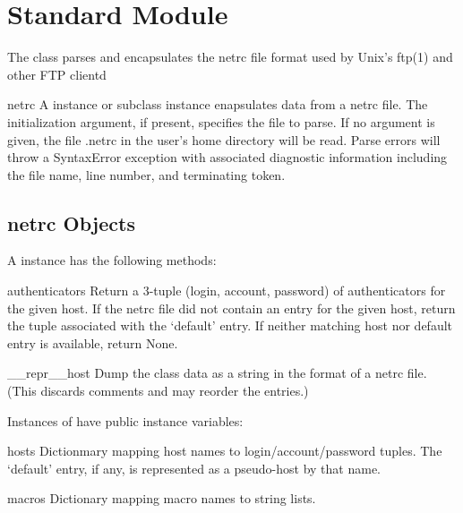 \section{Standard Module }
\label{module-netrc}

The  class parses and encapsulates the netrc file format
used by Unix's ftp(1) and other FTP clientd

\begin{classdesc}{netrc}{}
A  instance or subclass instance enapsulates data from 
a netrc file.  The initialization argument, if present, specifies the file
to parse.  If no argument is given, the file .netrc in the user's home
directory will be read.  Parse errors will throw a SyntaxError
exception with associated diagnostic information including the file
name, line number, and terminating token.
\end{classdesc}

\subsection{netrc Objects}
\label{netrc-objects}

A  instance has the following methods:

\begin{methoddesc}{authenticators}{}
Return a 3-tuple (login, account, password) of authenticators for the
given host.  If the netrc file did not contain an entry for the given
host, return the tuple associated with the `default' entry.  If
neither matching host nor default entry is available, return None.
\end{methoddesc}

\begin{methoddesc}{__repr__}{host}
Dump the class data as a string in the format of a netrc file.
(This discards comments and may reorder the entries.)
\end{methoddesc}

Instances of  have public instance variables:

\begin{memberdesc}{hosts}
Dictionmary mapping host names to login/account/password tuples.  The
`default' entry, if any, is represented as a pseudo-host by that name.
\end{memberdesc}

\begin{memberdesc}{macros}
Dictionary mapping macro names to string lists.
\end{memberdesc}



